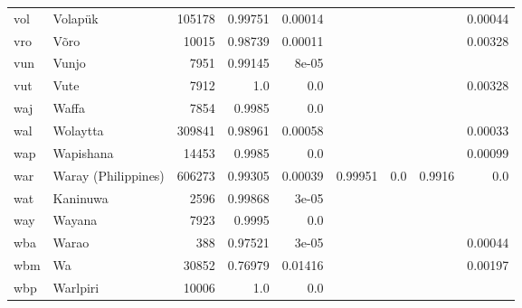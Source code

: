 \documentclass[11pt]{article}
\begin{document}
\begin{table*}[h]
{\begin{tabular}{llrrrrrrr}
vol         & Volapük         & 105178         & 0.99751         & 0.00014         &          &          &          & 0.00044         \\

vro         & Võro         & 10015         & 0.98739         & 0.00011         &          &          &          & 0.00328         \\

vun         & Vunjo         & 7951         & 0.99145         & 8e-05         &          &          &          &          \\

vut         & Vute         & 7912         & 1.0         & 0.0         &          &          &          & 0.00328         \\

waj         & Waffa         & 7854         & 0.9985         & 0.0         &          &          &          &          \\

wal         & Wolaytta         & 309841         & 0.98961         & 0.00058         &          &          &          & 0.00033         \\

wap         & Wapishana         & 14453         & 0.9985         & 0.0         &          &          &          & 0.00099         \\

war         & Waray (Philippines)         & 606273         & 0.99305         & 0.00039         & 0.99951         & 0.0         & 0.9916         & 0.0         \\

wat         & Kaninuwa         & 2596         & 0.99868         & 3e-05         &          &          &          &          \\

way         & Wayana         & 7923         & 0.9995         & 0.0         &          &          &          &          \\

wba         & Warao         & 388         & 0.97521         & 3e-05         &          &          &          & 0.00044         \\

wbm         & Wa         & 30852         & 0.76979         & 0.01416         &          &          &          & 0.00197         \\

wbp         & Warlpiri         & 10006         & 1.0         & 0.0         &          &          &          &          \\


\end{tabular}}
\end{table*}
\end{document}
